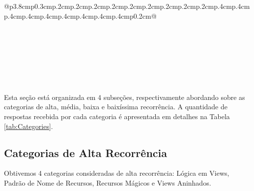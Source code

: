 \begin{table*}[t]
\begin{tabular}{@{}p{3.8cm}p{0.3cm}p{.2cm}p{.2cm}p{.2cm}p{.2cm}p{.2cm}p{.2cm}p{.2cm}p{.2cm}p{.2cm}p{.4cm}p{.4cm}p{.4cm}p{.4cm}p{.4cm}p{.4cm}p{.4cm}p{.4cm}p{.4cm}p{0.2cm}@{}}
\hline

 \\
 \\
 \\
 \\
 \\
 \\
\toprule
\end{tabular}
\caption{Lista de categorias de alta, m\'edia e baixa recorr\^encia.}
\label{tab:Categories}
\end{table*}


Esta se\c{c}\~ao est\'a organizada em 4 subse\c{c}\~oes, respectivamente abordando sobre as categorias de alta, m\'edia, baixa e baix\'issima recorr\^encia. A quantidade de respostas recebida por cada categoria \'e apresentada em detalhes na Tabela \ref{tab:Categories}.

\subsection{Categorias de Alta Recorr\^encia}
Obtivemos 4 categorias consideradas de alta recorr\^encia: L\'ogica em Views, Padr\~ao de Nome de Recursos, Recursos M\'agicos e Views Aninhados.


